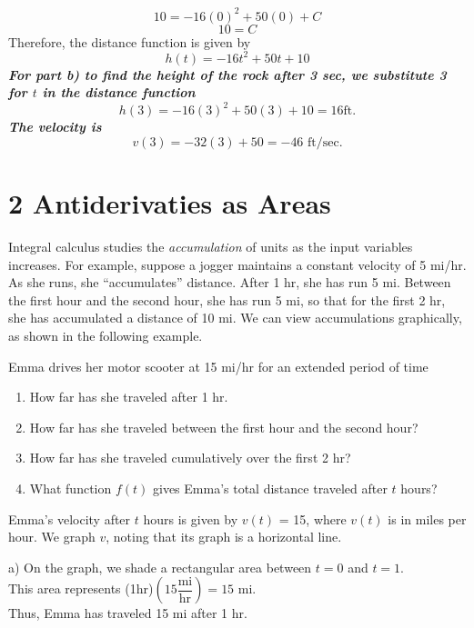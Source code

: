 \documentclass{report}
\begin{document}
$$ 10 = -16(0)^2 + 50(0) +C$$
$$ 10=C$$
Therefore, the distance function is given by
$$ h(t) = -16t^2 +50t +10$$
\bigbreak \noindent
\textit{\textbf{For part b) to find the height of the rock after 3 sec, we substitute 3 for $t$ in the distance function}}
$$ h(3) = -16(3)^2 +50(3) + 10 = 16 \text{ft.}$$
\textit{\textbf{The velocity is}}
$$v(3) = -32(3)+50 = -46\text{ ft/sec.}$$
\newpage
\section*{2 Antiderivaties as Areas}
Integral calculus studies the \textit{accumulation} of units as the input variables increases. For example, suppose a jogger maintains a constant velocity of 5 mi/hr. As she runs, she ``accumulates'' distance. After 1 hr, she has run 5 mi. Between the first hour and the second hour, she has run 5 mi, so that for the first 2 hr, she has accumulated a distance of 10 mi.
\bigbreak \noindent
We can view accumulations graphically, as shown in the following example.
\begin{mdframed}
\q
Emma drives her motor scooter at 15 mi/hr for an extended period of time
\begin{enumerate}
  \item How far has she traveled after 1 hr. 
  \item How far has she traveled between the first hour and the second hour?
  \item How far has she traveled cumulatively over the first 2 hr?
  \item What function $f(t)$ gives Emma's total distance traveled after $t$ hours?
    \vspace{1em}
\end{enumerate}
\end{mdframed}
\sol
Emma's velocity after $t$ hours is given by $v(t)$ = 15, where $v(t)$ is in miles per hour. We graph $v$, noting that its graph is a horizontal line.
\bigbreak \noindent
\begin{minipage}{0.5\textwidth}
	
a) On the graph, we shade a rectangular area between $t=0$ and $t=1$.  \\ This area represents (1hr)$\left(15\dfrac{\text{mi}}{\text{hr}}\right) = 15 \text{ mi}$. \\ Thus, Emma has traveled 15 mi after 1 hr.
\end{minipage}
\hspace{10mm}\begin{minipage}{0.5\textwidth}	
\end{minipage}
\end{document}
